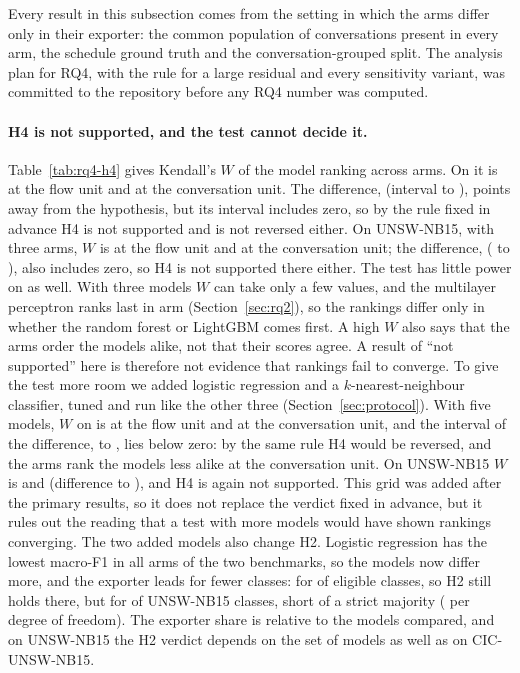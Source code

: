 Every result in this subsection comes from the setting in which the arms differ only in their exporter: the common population of conversations present in every arm, the schedule ground truth and the conversation-grouped split. The analysis plan for RQ4, with the rule for a large residual and every sensitivity variant, was committed to the repository before any RQ4 number was computed.

\paragraph{H4 is not supported, and the test cannot decide it.} Table~\ref{tab:rq4-h4} gives Kendall's $W$ of the model ranking across arms. On \cicids{} it is \RQfourWFlow{} at the flow unit and \RQfourWConv{} at the conversation unit. The difference, \RQfourDiff{} (interval \RQfourDiffLo{} to \RQfourDiffHi{}), points away from the hypothesis, but its interval includes zero, so by the rule fixed in advance H4 is not supported and is not reversed either. On UNSW-NB15, with three arms, $W$ is \RQfourWFlowUnsw{} at the flow unit and \RQfourWConvUnsw{} at the conversation unit; the difference, \RQfourDiffUnsw{} (\RQfourDiffLoUnsw{} to \RQfourDiffHiUnsw{}), also includes zero, so H4 is not supported there either. The test has little power on \cicids{} as well. With three models $W$ can take only a few values, and the multilayer perceptron ranks last in \RQtwoMlpLastArms{} arm (Section~\ref{sec:rq2}), so the rankings differ only in whether the random forest or LightGBM comes first. A high $W$ also says that the arms order the models alike, not that their scores agree. A result of ``not supported'' here is therefore not evidence that rankings fail to converge. To give the test more room we added logistic regression and a $k$-nearest-neighbour classifier, tuned and run like the other three (Section~\ref{sec:protocol}). With five models, $W$ on \cicids{} is \RevFiveWFlowCic{} at the flow unit and \RevFiveWConvCic{} at the conversation unit, and the interval of the difference, \RevFiveWDiffLoCic{} to \RevFiveWDiffHiCic{}, lies below zero: by the same rule H4 would be reversed, and the arms rank the models less alike at the conversation unit. On UNSW-NB15 $W$ is \RevFiveWFlowUnsw{} and \RevFiveWConvUnsw{} (difference \RevFiveWDiffLoUnsw{} to \RevFiveWDiffHiUnsw{}), and H4 is again not supported. This grid was added after the primary results, so it does not replace the verdict fixed in advance, but it rules out the reading that a test with more models would have shown rankings converging. The two added models also change H2. Logistic regression has the lowest macro-F1 in all \RevFiveArms{} arms of the two benchmarks, so the models now differ more, and the exporter leads for fewer classes: for \RevFiveAboveCic{} of \RevEligCic{} eligible \cicids{} classes, so H2 still holds there, but for \RevFiveAboveUnsw{} of \RevEligUnsw{} UNSW-NB15 classes, short of a strict majority (\RevFivePerdfAboveUnsw{} per degree of freedom). The exporter share is relative to the models compared, and on UNSW-NB15 the H2 verdict depends on the set of models as well as on CIC-UNSW-NB15.

